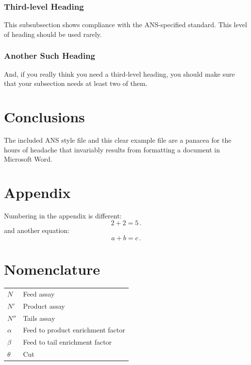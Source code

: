 \documentclass{anstrans}
\begin{document}
\subsubsection{Third-level Heading}
This subsubsection shows compliance with the ANS-specified standard. This level
of heading should be used rarely.

\subsubsection{Another Such Heading}
And, if you really think you need a third-level heading, you should make sure
that your subsection needs at least two of them.

\section{Conclusions}

The included ANS style file and this clear example file are a panacea for
the hours of headache that invariably results from formatting a document in
Microsoft Word.

\appendix
\section{Appendix}

Numbering in the appendix is different:
\begin{equation} \label{eq:appendix}
  2 + 2 = 5\,.
\end{equation}
and another equation:
\begin{equation} \label{eq:appendix2}
  a + b = c\,.
\end{equation}

\section{Nomenclature}

\begin{table}[H]
    \centering
    \begin{tabular}{l|l}
        $N$ & Feed assay \\
        $N'$ & Product assay \\
        $N''$ & Tails assay \\
        $\alpha$ & Feed to product enrichment factor \\
        $\beta$ & Feed to tail enrichment factor \\
        $\theta$ & Cut
    \end{tabular}
    \label{tab:my_label}
\end{table}
\end{document}
